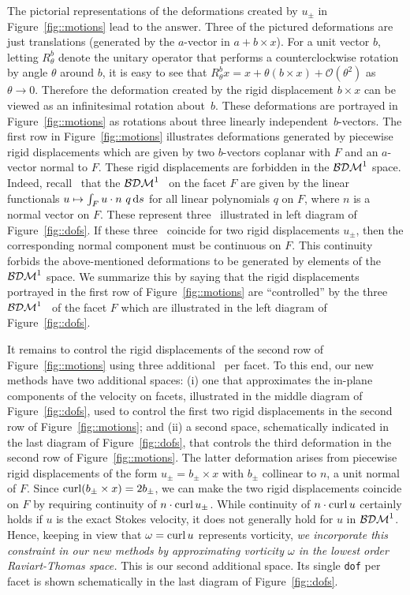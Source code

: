 The pictorial representations of the deformations created by $u_\pm$
in Figure~\ref{fig::motions} lead to the answer. Three of the pictured
deformations are just translations (generated by the $a$-vector in $a
+ b \times x$).  For a unit vector $b$, letting $R^b_\theta$ denote
the unitary operator that performs a counterclockwise rotation by
angle $\theta$ around $b$, it is easy to see that $R^b_\theta x = x +
\theta (b \times x) + \mathcal{O}(\theta^2)$ as $\theta \to 0$.
Therefore the deformation created by the rigid displacement $b \times
x$ can be viewed as an infinitesimal rotation about~$b$. These
deformations are portrayed in Figure~\ref{fig::motions} as rotations
about three linearly  independent~$b$-vectors.  The first row in
Figure~\ref{fig::motions} illustrates deformations generated by
piecewise rigid displacements which are given by two $b$-vectors
coplanar with $F$ and an $a$-vector normal to $F$.  These rigid
displacements are forbidden in the $\mathcal{BDM}^1$ space. Indeed, 
recall~\cite{brezzi2012mixed} that the $\mathcal{BDM}^1$ \dofs\ on the facet
  $F$ are given by the linear functionals
  $ u \mapsto \int_F u \cdot n ~q \mathop{\mathrm{d} s}$ for all linear polynomials $q$  on $F$,
  where $n$ is a normal vector on $F$. These represent three \dofs\ illustrated in
  left diagram of Figure~\ref{fig::dofs}.
  If these three \dofs\ coincide for two
rigid displacements $u_{\pm}$, then the corresponding normal component must
be continuous on $F$. This continuity forbids the
above-mentioned deformations to be generated by 
elements of the $\mathcal{BDM}^1$ space. We summarize this by saying that the  rigid displacements
portrayed in the first row of Figure~\ref{fig::motions}
are ``controlled'' by the three $\mathcal{BDM}^1$ \dofs~of the facet $F$ which
are illustrated in the left diagram of Figure~\ref{fig::dofs}.



It remains to control the rigid displacements of the second row of
Figure~\ref{fig::motions} using three additional \dofs\ per facet.
To this end, our new methods have two additional spaces: (i) one that
approximates the in-plane components of the velocity on facets,
illustrated in the middle diagram of Figure~\ref{fig::dofs}, used to
control the first two rigid displacements in the second row of
Figure~\ref{fig::motions}; and (ii) a second space, schematically
indicated in the last diagram of Figure~\ref{fig::dofs}, that controls
the third deformation in the second row of Figure~\ref{fig::motions}.
The latter deformation arises from piecewise rigid displacements of the form
$u_\pm = b_\pm \times x$ with $b_\pm$ collinear to $n$, a unit normal
of $F$.  Since $\operatorname{curl}(b_\pm \times x) = 2 b_\pm$, we can make the two
rigid displacements coincide on $F$ by requiring continuity of
$n \cdot \operatorname{curl} u_\pm$. While continuity of $n \cdot \operatorname{curl} u$
certainly holds if $u$ is the exact Stokes velocity, it does not
generally hold for $u$ in $\mathcal{BDM}^1$. Hence, keeping in view that
$\omega = \operatorname{curl} u$ represents vorticity, {\em we incorporate this
  constraint in our new methods by approximating vorticity $\omega$ in the lowest
  order Raviart-Thomas space.} This is our second additional space.
Its single {\tt dof}  per facet  is shown schematically in the last diagram of
Figure~\ref{fig::dofs}.


